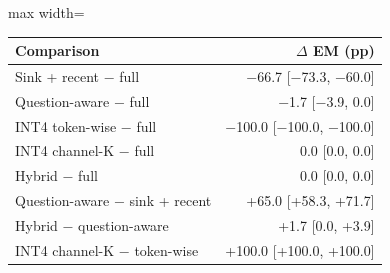 \scriptsize
\setlength{\tabcolsep}{3.5pt}
\label{tab:t2cboot}
\begin{adjustbox}{max width=\linewidth}
\begin{tabular}{lr}
\toprule
Comparison & $\Delta$ EM (pp) \\
\midrule
Sink + recent $-$ full & $-$66.7 [$-$73.3, $-$60.0] \\
Question-aware $-$ full & $-$1.7 [$-$3.9, 0.0] \\
INT4 token-wise $-$ full & $-$100.0 [$-$100.0, $-$100.0] \\
INT4 channel-K $-$ full & 0.0 [0.0, 0.0] \\
Hybrid $-$ full & 0.0 [0.0, 0.0] \\
Question-aware $-$ sink + recent & +65.0 [+58.3, +71.7] \\
Hybrid $-$ question-aware & +1.7 [0.0, +3.9] \\
INT4 channel-K $-$ token-wise & +100.0 [+100.0, +100.0] \\
\bottomrule
\end{tabular}
\end{adjustbox}
